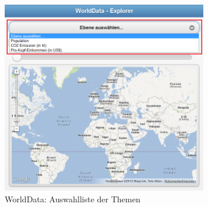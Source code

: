 \begin{figure}[H]
	\centering
	\includegraphics[width=0.8\textwidth]{images/usecase1-worlddata/documentation/worlddata-application_start}
	\caption{WorldData: Auswahlliste der Themen}
	\label{worlddata-application_start}
\end{figure}